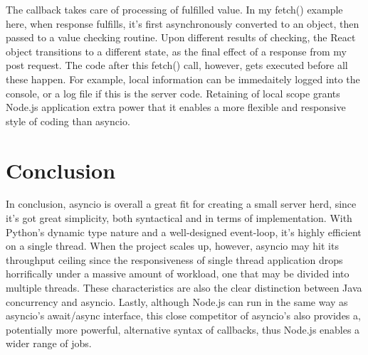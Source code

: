 \documentclass[letterpaper,twocolumn,10pt]{article}
\begin{document}
The callback takes care of processing of fulfilled value.
In my fetch() example here, when response fulfills, it's first asynchronously converted to an object, then passed to a value checking routine.
Upon different results of checking, the React object transitions to a different state, as the final effect of a response from my post request.
The code after this fetch() call, however, gets executed before all these happen.
For example, local information can be immedaitely logged into the console, or a log file if this is the server code.
Retaining of local scope grants Node.js application extra power that it enables a more flexible and responsive style of coding than asyncio.

\section{Conclusion}

In conclusion, asyncio is overall a great fit for creating a small server herd, since it's got great simplicity, both syntactical and in terms of implementation.
With Python's dynamic type nature and a well-designed event-loop, it's highly efficient on a single thread.
When the project scales up, however, asyncio may hit its throughput ceiling since the responsiveness of single thread application drops horrifically under a massive amount of workload, one that may be divided into multiple threads.
These characteristics are also the clear distinction between Java concurrency and asyncio.
Lastly, although Node.js can run in the same way as asyncio's await/async interface, this close competitor of asyncio's also provides a, potentially more powerful, alternative syntax of callbacks, thus Node.js enables a wider range of jobs.


% 

\end{document}
